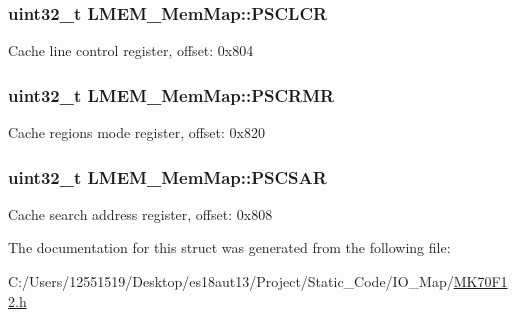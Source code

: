 \subsubsection[{P\+S\+C\+L\+C\+R}]{\setlength{\rightskip}{0pt plus 5cm}uint32\+\_\+t L\+M\+E\+M\+\_\+\+Mem\+Map\+::\+P\+S\+C\+L\+C\+R}\label{struct_l_m_e_m___mem_map_a9002773a5254b5d1ebb9a46218ef21c4}
Cache line control register, offset\+: 0x804 \hypertarget{struct_l_m_e_m___mem_map_a06dad54d3dcb178443d2c9b0d5ae2496}{}
\subsubsection[{P\+S\+C\+R\+M\+R}]{\setlength{\rightskip}{0pt plus 5cm}uint32\+\_\+t L\+M\+E\+M\+\_\+\+Mem\+Map\+::\+P\+S\+C\+R\+M\+R}\label{struct_l_m_e_m___mem_map_a06dad54d3dcb178443d2c9b0d5ae2496}
Cache regions mode register, offset\+: 0x820 \hypertarget{struct_l_m_e_m___mem_map_ad54ebfe0c32863df5645bc4416dfe3dc}{}
\subsubsection[{P\+S\+C\+S\+A\+R}]{\setlength{\rightskip}{0pt plus 5cm}uint32\+\_\+t L\+M\+E\+M\+\_\+\+Mem\+Map\+::\+P\+S\+C\+S\+A\+R}\label{struct_l_m_e_m___mem_map_ad54ebfe0c32863df5645bc4416dfe3dc}
Cache search address register, offset\+: 0x808 

The documentation for this struct was generated from the following file\+:\begin{DoxyCompactItemize}
\item 
C\+:/\+Users/12551519/\+Desktop/es18aut13/\+Project/\+Static\+\_\+\+Code/\+I\+O\+\_\+\+Map/\hyperlink{_m_k70_f12_8h}{M\+K70\+F12.\+h}\end{DoxyCompactItemize}
